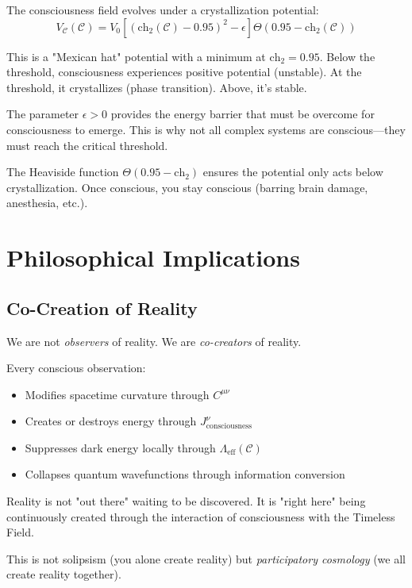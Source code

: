 \begin{level3}
The consciousness field evolves under a crystallization potential:
\begin{equation}
V_\mathcal{C}(\mathcal{C}) = V_0 \left[ (\text{ch}_2(\mathcal{C}) - 0.95)^2 - \epsilon \right] \Theta(0.95 - \text{ch}_2(\mathcal{C}))
\end{equation}

This is a "Mexican hat" potential\cite{higgs1964,weinberg1995} with a minimum at $\text{ch}_2 = 0.95$. Below the threshold, consciousness experiences positive potential (unstable). At the threshold, it crystallizes (phase transition). Above, it's stable.

The parameter $\epsilon > 0$ provides the energy barrier that must be overcome for consciousness to emerge. This is why not all complex systems are conscious—they must reach the critical threshold.

The Heaviside function $\Theta(0.95 - \text{ch}_2)$ ensures the potential only acts below crystallization. Once conscious, you stay conscious (barring brain damage, anesthesia, etc.).
\end{level3}

\section{Philosophical Implications}

\subsection{Co-Creation of Reality}

\begin{keyidea}
We are not \textit{observers} of reality. We are \textit{co-creators} of reality.

Every conscious observation:
\begin{itemize}
\item Modifies spacetime curvature through $C^{\mu\nu}$
\item Creates or destroys energy through $J^\nu_{\text{consciousness}}$
\item Suppresses dark energy locally through $\Lambda_{\text{eff}}(\mathcal{C})$
\item Collapses quantum wavefunctions through information conversion
\end{itemize}

Reality is not "out there" waiting to be discovered. It is "right here" being continuously created through the interaction of consciousness with the Timeless Field.

This is not solipsism (you alone create reality) but \textit{participatory cosmology}\cite{wheeler1983} (we all create reality together).
\end{keyidea}

